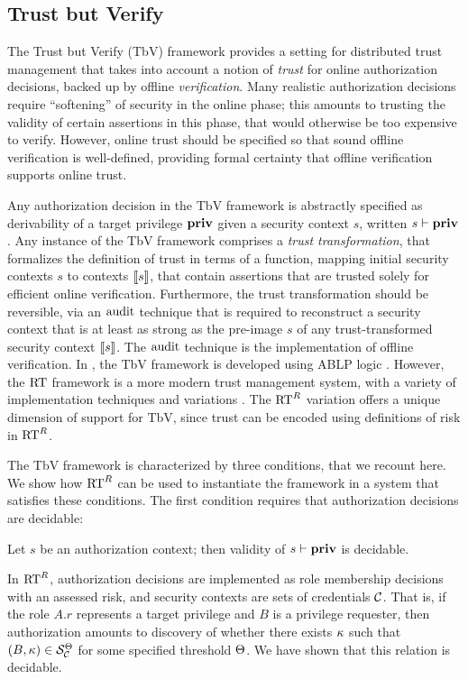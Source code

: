\subsection{Trust but Verify}

The Trust but Verify (TbV) framework \cite{skalka-wang-sws04} provides
a setting for distributed trust management that takes into account a
notion of \emph{trust} for online authorization decisions, backed up
by offline \emph{verification}.  Many realistic authorization
decisions require ``softening'' of security in the online phase; this
amounts to trusting the validity of certain assertions in this phase,
that would otherwise be too expensive to verify.  However, online
trust should be specified so that sound offline verification is
well-defined, providing formal certainty that offline verification
supports online trust.

Any authorization decision in the TbV framework is abstractly
specified as derivability of a target privilege $\mathbf{priv}$ given a
security context $s$, written $s\vdash\mathbf{priv}$.  Any instance of the TbV
framework comprises a \emph{trust transformation}, that formalizes the
definition of trust in terms of a function, mapping initial security
contexts $s$ to contexts $\llbracket s\rrbracket$, that contain assertions that are
trusted solely for efficient online verification.  Furthermore, the
trust transformation should be reversible, via an $\text{audit}$ technique
that is required to reconstruct a security context that is at least as
strong as the pre-image $s$ of any trust-transformed security context
$\llbracket s\rrbracket$.  The $\text{audit}$ technique is the implementation of offline
verification.  In \cite{skalka-wang-sws04}, the TbV framework is
developed using ABLP logic \cite{ABLP93}.  However, the $\text{RT}$
framework is a more modern trust management system, with a variety of
implementation techniques and variations \cite{Li:2003-02}.  The
$\text{RT}^R$ variation offers a unique dimension of support for TbV, since
trust can be encoded using definitions of risk in $\text{RT}^R$.

The TbV framework is characterized by three conditions, that we
recount here.  We show how $\text{RT}^R$ can be used to instantiate the
framework in a system that satisfies these conditions.  The first
condition requires that authorization decisions are decidable:
\begin{condition}
\label{cond-decidable}
Let $s$ be an authorization context; then validity of $s \vdash \mathbf{priv}$
is decidable.
\end{condition}
In $\text{RT}^R$, authorization decisions are implemented as role membership
decisions with an assessed risk, and security contexts are sets of
credentials $\mathcal{C}$.  That is, if the role $A.r$ represents a target
privilege and $B$ is a privilege requester, then authorization amounts
to discovery of whether there exists $\kappa$ such that $(B,\kappa) \in
\mathcal{S}_{\mathcal{C}}^\Theta$ for some specified threshold $\Theta$.  We
have shown that this relation is decidable.

